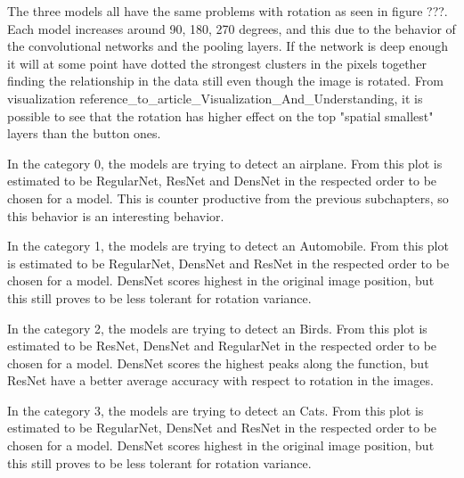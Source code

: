 The three models all have the same problems with rotation as seen in figure ???. Each model increases around 90, 180, 270 degrees, and this due to the behavior of the convolutional networks and the pooling layers. If the network is deep enough it will at some point have dotted the strongest clusters in the pixels together finding the relationship in the data still even though the image is rotated. From visualization reference_to_article_Visualization_And_Understanding, it is possible to see that the rotation has higher effect on the top "spatial smallest" layers than the button ones.

\FloatBarrier

In the category 0, the models are trying to detect an airplane. From this plot is estimated to be RegularNet, ResNet and DensNet in the respected order to be chosen for a model. This is counter productive from the previous subchapters, so this behavior is an interesting behavior.

\FloatBarrier

In the category 1, the models are trying to detect an Automobile. From this plot is estimated to be RegularNet, DensNet and ResNet in the respected order to be chosen for a model. DensNet scores highest in the original image position, but this still proves to be less tolerant for rotation variance. 

\FloatBarrier 

In the category 2, the models are trying to detect an Birds. From this plot is estimated to be ResNet, DensNet and RegularNet in the respected order to be chosen for a model. DensNet scores the highest peaks along the function, but ResNet have a better average accuracy with respect to rotation in the images. 

\FloatBarrier 

In the category 3, the models are trying to detect an Cats. From this plot is estimated to be RegularNet, DensNet and ResNet in the respected order to be chosen for a model. DensNet scores highest in the original image position, but this still proves to be less tolerant for rotation variance. 

